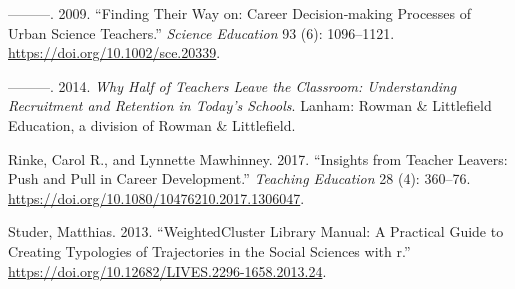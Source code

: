 \documentclass[
]{article}
\newlength{\cslhangindent}
\newlength{\cslentryspacingunit} %
\newenvironment{CSLReferences}[2] %
 {%
  \setlength{\parindent}{0pt}
  \ifodd #1
  \let\oldpar\par
  \def\par{\hangindent=\cslhangindent\oldpar}
  \fi
  \setlength{\parskip}{#2\cslentryspacingunit}
 }%
 {}
\begin{document}
\begin{CSLReferences}{1}{0}
\leavevmode{}%
---------. 2009. {``Finding Their Way on: Career Decision‐making Processes of Urban Science Teachers.''} \emph{Science Education} 93 (6): 1096--1121. \url{https://doi.org/10.1002/sce.20339}.

\leavevmode{}%
---------. 2014. \emph{Why Half of Teachers Leave the Classroom: Understanding Recruitment and Retention in Today's Schools}. Lanham: Rowman \& Littlefield Education, a division of Rowman \& Littlefield.

\leavevmode{}%
Rinke, Carol R., and Lynnette Mawhinney. 2017. {``Insights from Teacher Leavers: Push and Pull in Career Development.''} \emph{Teaching Education} 28 (4): 360--76. \url{https://doi.org/10.1080/10476210.2017.1306047}.

\leavevmode{}%
Studer, Matthias. 2013. {``WeightedCluster Library Manual: A Practical Guide to Creating Typologies of Trajectories in the Social Sciences with r.''} \url{https://doi.org/10.12682/LIVES.2296-1658.2013.24}.

\end{CSLReferences}
\end{document}
